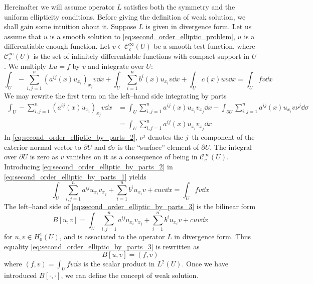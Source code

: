 Hereinafter we will assume operator $L$ satisfies both the symmetry and the
uniform ellipticity conditions. Before giving the definition of weak solution,
we shall gain some intuition about it. Suppose $L$ is given in divergence form.
Let us assume that $u$ is a smooth solution to
\eqref{eq:second_order_elliptic_problem}, \ie $u$ is a differentiable enough
function. Let $v \in \mathcal{C}_c^\infty(U)$ be a smooth test function, where
$\mathcal{C}_c^\infty(U)$ is the set of infinitely differentiable functions with
compact support in $U$. We multiply $L u = f$ by $v$ and integrate over $U$:
\begin{equation} \label{eq:second_order_elliptic_by_parts_1}
	\int_U - \sum_{i,j=1}^n (a^{ij}(x) u_{x_i})_{x_j} v \dd{x} + 
	\int_U \sum_{i=1}^n b^i(x) u_{x_i} v \dd{x} + 
	\int_U c(x) u v \dd{x} = 
	\int_U f v \dd{x}
\end{equation}
We may rewrite the first term on the left--hand side integrating by parts
\begin{align}
	\int_U - \sum_{i,j=1}^n (a^{ij}(x) u_{x_i})_{x_j} v \dd{x} &= 
	\int_U \sum_{i,j=1}^n a^{ij}(x) u_{x_i} v_{x_j} \dd{x} - 
	\int_{\partial U} \sum_{i,j=1}^n a^{ij}(x) u_{x_i} v \nu^j \dd{\sigma} \nonumber \\
	&= \int_U \sum_{i,j=1}^n a^{ij}(x) u_{x_i} v_{x_j} \dd{x} \label{eq:second_order_elliptic_by_parts_2}
\end{align}
In \eqref{eq:second_order_elliptic_by_parts_2}, $\nu^j$ denotes the $j$--th
component of the exterior normal vector to $\partial U$ and $\dd{\sigma}$ is the
``surface'' element of $\partial U$. The integral over $\partial U$ is zero as
$v$ vanishes on it as a consequence of being in $\mathcal{C}^\infty_c(U)$.
Introducing \eqref{eq:second_order_elliptic_by_parts_2} in
\eqref{eq:second_order_elliptic_by_parts_1} yields
\begin{equation} \label{eq:second_order_elliptic_by_parts_3}
	\int_U \sum_{i,j=1}^n a^{ij} u_{x_i} v_{x_j} + \sum_{i=1}^n b^i u_{x_i} v + c u v \dd{x} =
	\int_U f v \dd{x}
\end{equation}
The left--hand side of \eqref{eq:second_order_elliptic_by_parts_3} is the
bilinear form
\begin{equation*}
	B[u,v] = 
	\int_U \sum_{i,j=1}^n a^{ij} u_{x_i} v_{x_j} + \sum_{i=1}^n b^i u_{x_i} v + c u v \dd{x}
\end{equation*}
for $u, v \in H^1_0(U)$, and is associated to the operator $L$ in divergence
form. Thus equality \eqref{eq:second_order_elliptic_by_parts_3} is rewritten as
\begin{equation*}
	B[u,v] = (f, v)
\end{equation*}
where $(f, v) = \int_U f v \dd{x}$ is the scalar product in $L^2(U)$. Once we
have introduced $B[\cdot,\cdot]$, we can define the concept of weak solution.

